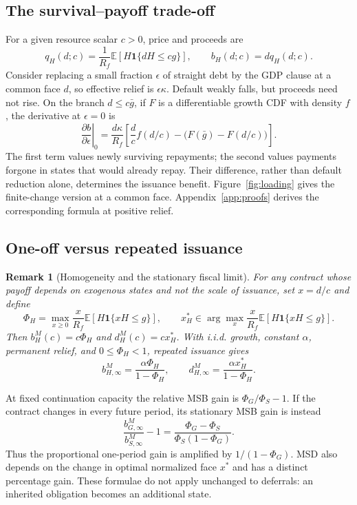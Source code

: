 \documentclass[11pt]{article}
\newtheorem{remark}{Remark}
\newcommand{\E}{\mathbb E}
\newcommand{\ind}{\mathbf 1}
\begin{document}
\subsection{The survival--payoff trade-off}
For a given resource scalar $c>0$, price and proceeds are
\begin{equation}\label{eq:pricing}
 q_H(d;c)=\frac{1}{R_f}\E\!\left[H\ind\{dH\le cg\}\right],\qquad b_H(d;c)=dq_H(d;c).
\end{equation}
Consider replacing a small fraction $\epsilon$ of straight debt by the GDP clause at a common face $d$, so effective relief is $\epsilon\kappa$. Default weakly falls, but proceeds need not rise. On the branch $d\le c\bar g$, if $F$ is a differentiable growth CDF with density $f$, the derivative at $\epsilon=0$ is
\begin{equation}\label{eq:tradeoff}
 \left.\frac{\partial b}{\partial\epsilon}\right|_0
 =\frac{d\kappa}{R_f}\left[\frac{d}{c}f(d/c)-\big(F(\bar g)-F(d/c)\big)\right].
\end{equation}
The first term values newly surviving repayments; the second values payments forgone in states that would already repay. Their difference, rather than default reduction alone, determines the issuance benefit. Figure~\ref{fig:loading} gives the finite-change version at a common face. Appendix~\ref{app:proofs} derives the corresponding formula at positive relief.



\subsection{One-off versus repeated issuance}
\begin{remark}[Homogeneity and the stationary fiscal limit]\label{rem:homogeneity}
For any contract whose payoff depends on exogenous states and not the scale of issuance, set $x=d/c$ and define
\begin{equation}\label{eq:phi}
 \Phi_H=\max_{x\ge0}\frac{x}{R_f}\E[H\ind\{xH\le g\}],\qquad
 x_H^*\in\arg\max_x\frac{x}{R_f}\E[H\ind\{xH\le g\}].
\end{equation}
Then $b_H^M(c)=c\Phi_H$ and $d_H^M(c)=cx_H^*$. With i.i.d. growth, constant $\alpha$, permanent relief, and $0\le\Phi_H<1$, repeated issuance gives
\begin{equation}\label{eq:stationary}
 b_{H,\infty}^M=\frac{\alpha\Phi_H}{1-\Phi_H},\qquad
 d_{H,\infty}^M=\frac{\alpha x_H^*}{1-\Phi_H}.
\end{equation}
\end{remark}
At fixed continuation capacity the relative MSB gain is $\Phi_G/\Phi_S-1$. If the contract changes in every future period, its stationary MSB gain is instead
\begin{equation}\label{eq:stationarygain}
 \frac{b_{G,\infty}^M}{b_{S,\infty}^M}-1
 =\frac{\Phi_G-\Phi_S}{\Phi_S(1-\Phi_G)}.
\end{equation}
Thus the proportional one-period gain is amplified by $1/(1-\Phi_G)$. MSD also depends on the change in optimal normalized face $x^*$ and has a distinct percentage gain. These formulae do not apply unchanged to deferrals: an inherited obligation becomes an additional state.
\end{document}

